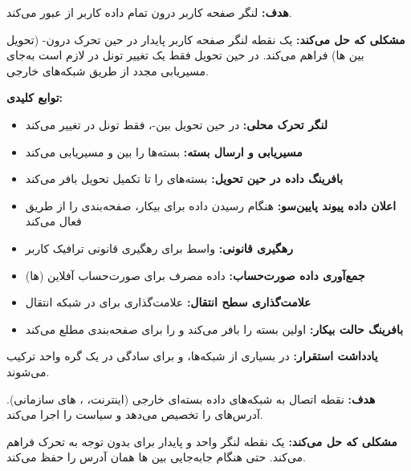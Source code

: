
\textbf{هدف:} لنگر صفحه کاربر درون   تمام داده کاربر از  عبور می‌کند.

\textbf{مشکلی که حل می‌کند:} یک نقطه لنگر صفحه کاربر پایدار در حین تحرک درون- (تحویل بین ها) فراهم می‌کند. در حین تحویل فقط یک تغییر تونل در  لازم است به‌جای مسیریابی مجدد از طریق شبکه‌های خارجی.

\textbf{توابع کلیدی:}

\begin{itemize}
\tightlist
\item
  \textbf{لنگر تحرک محلی:} در حین تحویل بین-، فقط تونل  در  تغییر می‌کند
\item
  \textbf{مسیریابی و ارسال بسته:} بسته‌ها را بین  و  مسیریابی می‌کند
\item
  \textbf{بافرینگ داده در حین تحویل:} بسته‌های  را تا تکمیل تحویل بافر می‌کند
\item
  \textbf{اعلان داده پیوند پایین‌سو:} هنگام رسیدن داده  برای  بیکار، صفحه‌بندی را از طریق  فعال می‌کند
\item
  \textbf{رهگیری قانونی:} واسط برای رهگیری قانونی ترافیک کاربر
\item
  \textbf{جمع‌آوری داده صورت‌حساب:} داده مصرف برای صورت‌حساب آفلاین (ها)
\item
  \textbf{علامت‌گذاری سطح انتقال:} علامت‌گذاری  برای  در شبکه انتقال
\item
  \textbf{بافرینگ حالت بیکار:} اولین بسته  را بافر می‌کند و  را برای صفحه‌بندی مطلع می‌کند
\end{itemize}

\textbf{یادداشت استقرار:} در بسیاری از شبکه‌ها،  و  برای سادگی در یک گره واحد  ترکیب می‌شوند.


\textbf{هدف:} نقطه اتصال به شبکه‌های داده بسته‌ای خارجی (اینترنت، ، های سازمانی). آدرس‌های  را تخصیص می‌دهد و سیاست را اجرا می‌کند.

\textbf{مشکلی که حل می‌کند:} یک نقطه لنگر  واحد و پایدار برای  بدون توجه به تحرک فراهم می‌کند.  حتی هنگام جابه‌جایی بین ها همان آدرس  را حفظ می‌کند.

